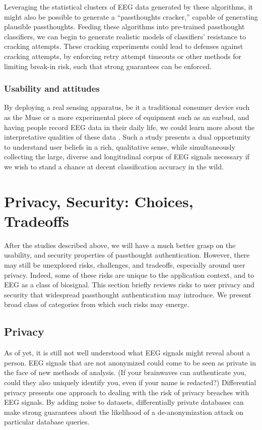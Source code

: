 \documentclass[sigconf]{acmart}
\begin{document}
Leveraging the statistical clusters of EEG data generated by these algorithms, it might also be possible to generate a ``passthoughts cracker,'' capable of generating plausible passthoughts. 
Feeding these algorithms into pre-trained passthought classifiers, we can begin to generate realistic models of classifiers' resistance to cracking attempts. 
These cracking experiments could lead to defenses against cracking attempts, by enforcing retry attempt timeouts or other methods for limiting break-in risk, such that strong guarantees can be enforced.

\subsubsection{Usability and attitudes}
\label{sec:org6bec26f}

By deploying a real sensing apparatus, be it a traditional consumer device such as the Muse \cite{Mihajlovic2015} 
or a more experimental piece of equipment such as an earbud,
and having people record EEG data in their daily life, we could learn more about the interpretative qualities of these data \cite{NafusDawn;Sherman2014}.
Such a study presents a dual opportunity to understand user beliefs in a rich, qualitative sense, while simultaneously collecting the large, diverse and longitudinal corpus of EEG signals necessary if we wish to stand a chance at decent classification accuracy in the wild.

\section{Privacy, Security: Choices, Tradeoffs}
\label{sec:org210fd82}

After the studies described above, 
we will have a much better grasp on the usability, and security properties of passthought authentication.
However, there may still be unexplored risks, challenges, and tradeoffs,
especially around user privacy.
Indeed, some of these risks are unique to the application context, and to EEG as a class of biosignal. 
This section briefly reviews risks to user privacy and security that widespread passthought authentication may introduce. 
We present broad class of categories from which such risks may emerge. 

\subsection{Privacy}
\label{sec:orgabf551f}
As of yet, it is still not well understood what EEG signals might reveal about a person.
EEG signals that are not anonymized could come to be seen as private in the face of new methods of analysis.
(If your brainwaves can authenticate you, could they also uniquely identify you, even if your name is redacted?)
Differential privacy \cite{Dwork2014} presents one approach to dealing with the risk of privacy breaches with EEG signals.
By adding noise to datasets, differentially private databases can make strong guarantees about the likelihood of a de-anonymization attack on particular database queries.
\end{document}
